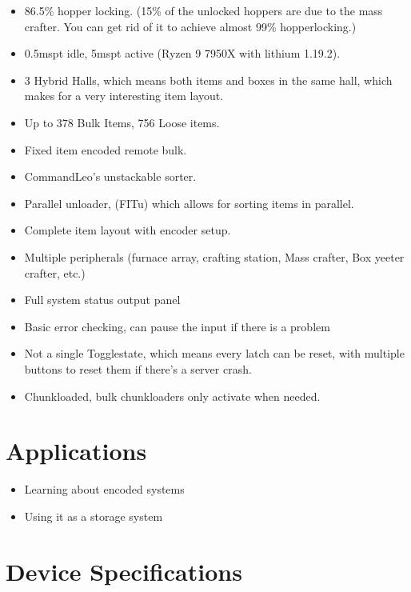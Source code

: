 \documentclass[10pt]{datasheet}
\begin{document}
\begin{itemize}
\item{86.5\% hopper locking. (15\% of the unlocked hoppers are due to the mass crafter. You can get rid of it to achieve almost 99\% hopperlocking.)}
\item{0.5mspt idle, 5mspt active (Ryzen 9 7950X with lithium 1.19.2).}
\item{3 Hybrid Halls, which means both items and boxes in the same hall, which makes for a very interesting item layout.}
\item{Up to 378 Bulk Items, 756 Loose items.}
\item{Fixed item encoded remote bulk.}
\item{CommandLeo's unstackable sorter.}
\item{Parallel unloader, (FITu) which allows for sorting items in parallel.}
\item{Complete item layout with encoder setup.}
\item{Multiple peripherals (furnace array, crafting station, Mass crafter, Box yeeter crafter, etc.)}
\item{Full system status output panel}
\item{Basic error checking, can pause the input if there is a problem}
\item{Not a single Togglestate, which means every latch can be reset, with multiple buttons to reset them if there's a server crash.}
\item{Chunkloaded, bulk chunkloaders only activate when needed.}
\end{itemize}

\section{Applications}

\begin{itemize}
\item{Learning about encoded systems}
\item{Using it as a storage system}
\end{itemize}





\section{Device Specifications}
\end{document}
